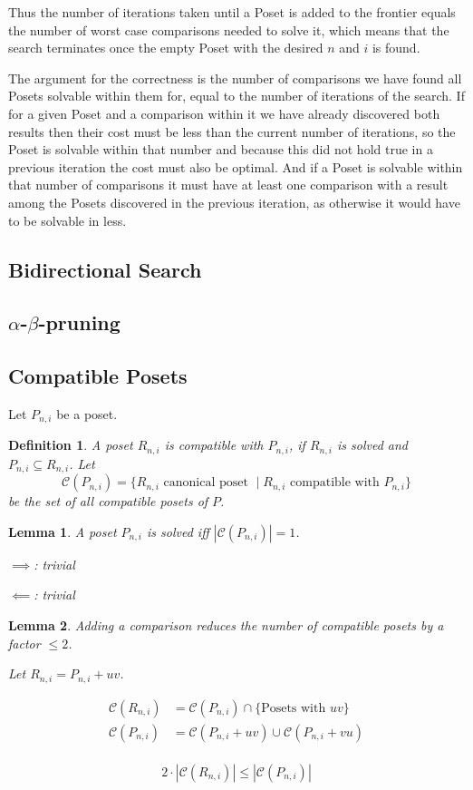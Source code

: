 \documentclass[10pt,journal,compsoc]{IEEEtran}
\newtheorem{lemma}{Lemma}
\newtheorem{definition}{Definition}
\begin{document}
Thus the number of iterations taken until a Poset is added to the frontier equals the number of
worst case comparisons needed to solve it, which means that the search terminates once the empty
Poset with the desired $n$ and $i$ is found.

The argument for the correctness is the number of comparisons we have found all Posets solvable
within them for, equal to the number of iterations of the search. If for a given Poset and a
comparison within it we have already discovered both results then their cost must be less than the
current number of iterations, so the Poset is solvable within that number and because this did not
hold true in a previous iteration the cost must also be optimal. And if a Poset is solvable within
that number of comparisons it must have at least one comparison with a result among the Posets
discovered in the previous iteration, as otherwise it would have to be solvable in less.

\subsection{Bidirectional Search}

\subsection{$\alpha$-$\beta$-pruning}

\subsection{Compatible Posets}

Let $P_{n,i}$ be a poset.
\begin{definition}
  A poset $R_{n,i}$ is compatible with $P_{n,i}$, if $R_{n,i}$ is solved and $P_{n,i} \subseteq
    R_{n,i}$. Let
  $$\mathcal{C}(P_{n,i}) = \{ R_{n,i} \text{ canonical poset } \mid R_{n,i} \text{ compatible with }
    P_{n,i} \}$$ be the set of all compatible posets of $P$.
\end{definition}

\begin{lemma}
  A poset $P_{n,i}$ is solved iff $|\mathcal{C}(P_{n,i})| = 1$.

  $\implies$: trivial

  $\impliedby$: trivial
\end{lemma}

\begin{lemma}
  Adding a comparison reduces the number of compatible posets by a factor $\leq 2$.

  Let $R_{n,i} = P_{n,i} + uv$.

  \begin{align*}
    \mathcal{C}(R_{n,i}) & = \mathcal{C}(P_{n,i}) \cap \{ \text{Posets with } uv \}   \\
    \mathcal{C}(P_{n,i}) & = \mathcal{C}(P_{n,i} + uv) \cup \mathcal{C}(P_{n,i} + vu) \\
  \end{align*}

  $$2 \cdot |\mathcal{C}(R_{n,i})| \leq |\mathcal{C}(P_{n,i})|$$
\end{lemma}
\end{document}
